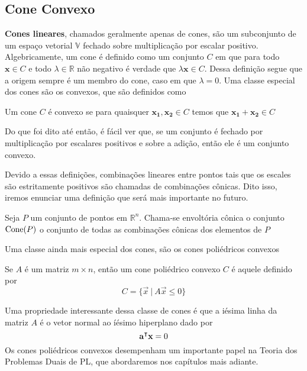 \subsection{Cone Convexo}

\textbf{Cones lineares}, chamados geralmente apenas de cones, são um subconjunto
de um espaço vetorial $\mathbb{V}$ fechado sobre multiplicação por escalar
positivo. Algebricamente, um cone é definido como um conjunto $C$ em que para
todo $\mathbf x \in C$ e todo $\lambda \in \mathbb{R}$ não negativo é verdade
que \(\lambda \mathbf{x} \in C\). Dessa definição segue que a origem sempre é um
membro do cone, caso em que $\lambda = 0$. Uma classe especial dos cones são os
convexos, que são definidos como

\begin{def:cone convexo}
	Um cone $C$ é convexo se para quaisquer $\mathbf{x_1, x_2} \in C$ temos que $\mathbf{x_1} + \mathbf{x_2} \in C$
\end{def:cone convexo}

Do que foi dito até então, é fácil ver que, se um conjunto é fechado por multiplicação
por escalares positivos e sobre a adição, então ele é um conjunto convexo.

Devido a essas definições, combinações lineares entre pontos tais que os escales
são estritamente positivos são chamadas de combinações cônicas. Dito isso, iremos
enunciar uma definição que será mais importante no futuro.

\begin{def:cone hull}
  Seja $P$ um conjunto de pontos em $\mathbb{R}^n$. Chama-se envoltória cônica o
  conjunto $\mathrm{Cone}(P)$ o conjunto de todas as combinações cônicas dos elementos de $P$
\end{def:cone hull}

Uma classe ainda mais especial dos cones, são os cones poliédricos convexos

\begin{def:cpc}
	Se $A$ é um matriz $m \times n$, então um cone poliédrico convexo $C$ é aquele definido por
	\begin{equation*}
		C = \{\vec{x}\ |\ A \vec{x} \leq 0\}
	\end{equation*}
\end{def:cpc}

Uma propriedade interessante dessa classe de cones é que a iésima linha da matriz $A$ é o
vetor normal ao íésimo hiperplano dado por \[\mathbf{\mathbf{a}^\intercal x} = 0\]
Os cones poliédricos convexos desempenham um importante papel na Teoria dos
Problemas Duais de PL, que abordaremos nos capítulos mais adiante.

